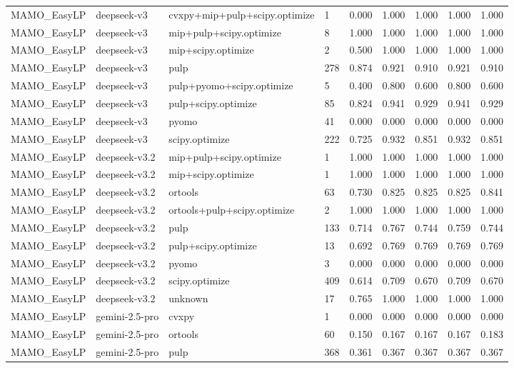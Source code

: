 \begin{table}[t]
\begin{tabular}{lllllllll}
MAMO\_EasyLP & deepseek-v3 & cvxpy+mip+pulp+scipy.optimize & 1 & 0.000 & 1.000 & 1.000 & 1.000 & 1.000 \\
MAMO\_EasyLP & deepseek-v3 & mip+pulp+scipy.optimize & 8 & 1.000 & 1.000 & 1.000 & 1.000 & 1.000 \\
MAMO\_EasyLP & deepseek-v3 & mip+scipy.optimize & 2 & 0.500 & 1.000 & 1.000 & 1.000 & 1.000 \\
MAMO\_EasyLP & deepseek-v3 & pulp & 278 & 0.874 & 0.921 & 0.910 & 0.921 & 0.910 \\
MAMO\_EasyLP & deepseek-v3 & pulp+pyomo+scipy.optimize & 5 & 0.400 & 0.800 & 0.600 & 0.800 & 0.600 \\
MAMO\_EasyLP & deepseek-v3 & pulp+scipy.optimize & 85 & 0.824 & 0.941 & 0.929 & 0.941 & 0.929 \\
MAMO\_EasyLP & deepseek-v3 & pyomo & 41 & 0.000 & 0.000 & 0.000 & 0.000 & 0.000 \\
MAMO\_EasyLP & deepseek-v3 & scipy.optimize & 222 & 0.725 & 0.932 & 0.851 & 0.932 & 0.851 \\
MAMO\_EasyLP & deepseek-v3.2 & mip+pulp+scipy.optimize & 1 & 1.000 & 1.000 & 1.000 & 1.000 & 1.000 \\
MAMO\_EasyLP & deepseek-v3.2 & mip+scipy.optimize & 1 & 1.000 & 1.000 & 1.000 & 1.000 & 1.000 \\
MAMO\_EasyLP & deepseek-v3.2 & ortools & 63 & 0.730 & 0.825 & 0.825 & 0.825 & 0.841 \\
MAMO\_EasyLP & deepseek-v3.2 & ortools+pulp+scipy.optimize & 2 & 1.000 & 1.000 & 1.000 & 1.000 & 1.000 \\
MAMO\_EasyLP & deepseek-v3.2 & pulp & 133 & 0.714 & 0.767 & 0.744 & 0.759 & 0.744 \\
MAMO\_EasyLP & deepseek-v3.2 & pulp+scipy.optimize & 13 & 0.692 & 0.769 & 0.769 & 0.769 & 0.769 \\
MAMO\_EasyLP & deepseek-v3.2 & pyomo & 3 & 0.000 & 0.000 & 0.000 & 0.000 & 0.000 \\
MAMO\_EasyLP & deepseek-v3.2 & scipy.optimize & 409 & 0.614 & 0.709 & 0.670 & 0.709 & 0.670 \\
MAMO\_EasyLP & deepseek-v3.2 & unknown & 17 & 0.765 & 1.000 & 1.000 & 1.000 & 1.000 \\
MAMO\_EasyLP & gemini-2.5-pro & cvxpy & 1 & 0.000 & 0.000 & 0.000 & 0.000 & 0.000 \\
MAMO\_EasyLP & gemini-2.5-pro & ortools & 60 & 0.150 & 0.167 & 0.167 & 0.167 & 0.183 \\
MAMO\_EasyLP & gemini-2.5-pro & pulp & 368 & 0.361 & 0.367 & 0.367 & 0.367 & 0.367 \\

\end{tabular}
\end{table}
